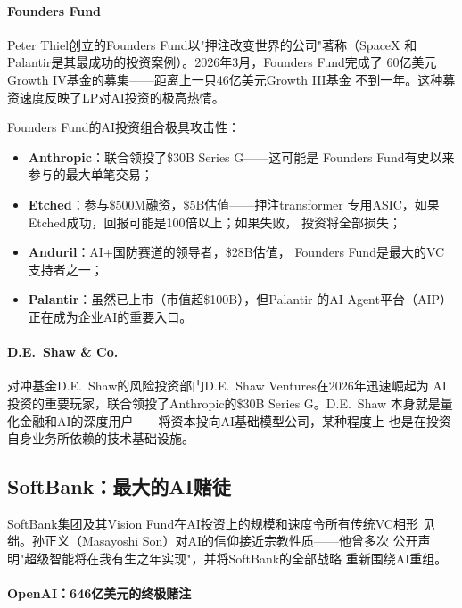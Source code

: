 \paragraph{Founders Fund}

Peter Thiel创立的Founders Fund以"押注改变世界的公司"著称（SpaceX
和Palantir是其最成功的投资案例）。2026年3月，Founders Fund完成了
60亿美元Growth IV基金的募集——距离上一只46亿美元Growth III基金
不到一年。这种募资速度反映了LP对AI投资的极高热情。

Founders Fund的AI投资组合极具攻击性：
\begin{itemize}
  \item \textbf{Anthropic}：联合领投了\$30B Series G——这可能是
    Founders Fund有史以来参与的最大单笔交易；
  \item \textbf{Etched}：参与\$500M融资，\$5B估值——押注transformer
    专用ASIC，如果Etched成功，回报可能是100倍以上；如果失败，
    投资将全部损失；
  \item \textbf{Anduril}：AI+国防赛道的领导者，\$28B估值，
    Founders Fund是最大的VC支持者之一；
  \item \textbf{Palantir}：虽然已上市（市值超\$100B），但Palantir
    的AI Agent平台（AIP）正在成为企业AI的重要入口。
\end{itemize}

\paragraph{D.E.~Shaw \& Co.}

对冲基金D.E.~Shaw的风险投资部门D.E.~Shaw Ventures在2026年迅速崛起为
AI投资的重要玩家，联合领投了Anthropic的\$30B Series G。D.E.~Shaw
本身就是量化金融和AI的深度用户——将资本投向AI基础模型公司，某种程度上
也是在投资自身业务所依赖的技术基础设施。

\subsection{SoftBank：最大的AI赌徒}
\label{subsec:fund-softbank}

SoftBank集团及其Vision Fund在AI投资上的规模和速度令所有传统VC相形
见绌。孙正义（Masayoshi Son）对AI的信仰接近宗教性质——他曾多次
公开声明"超级智能将在我有生之年实现"，并将SoftBank的全部战略
重新围绕AI重组。

\paragraph{OpenAI：646亿美元的终极赌注}

